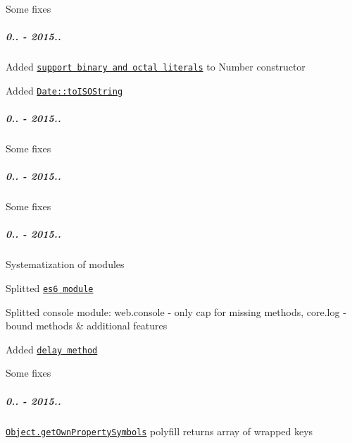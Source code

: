 \begin{DoxyItemize}
\item Some fixes
\end{DoxyItemize}

\subparagraph*{0.. -\/ 2015..}


\begin{DoxyItemize}
\item Added \href{https://github.com/zloirock/core-js/#ecmascript-6-number}{\tt support binary and octal literals} to {\ttfamily Number} constructor
\item Added \href{https://github.com/zloirock/core-js/#ecmascript-5}{\tt {\ttfamily Date\+::to\+I\+S\+O\+String}}
\end{DoxyItemize}

\subparagraph*{0.. -\/ 2015..}


\begin{DoxyItemize}
\item Some fixes
\end{DoxyItemize}

\subparagraph*{0.. -\/ 2015..}


\begin{DoxyItemize}
\item Some fixes
\end{DoxyItemize}

\subparagraph*{0.. -\/ 2015..}


\begin{DoxyItemize}
\item Systematization of modules
\item Splitted \href{https://github.com/zloirock/core-js/#ecmascript-6}{\tt {\ttfamily es6} module}
\item Splitted {\ttfamily console} module\+: {\ttfamily web.\+console} -\/ only cap for missing methods, {\ttfamily core.\+log} -\/ bound methods \& additional features
\item Added \href{https://github.com/zloirock/core-js/#delay}{\tt {\ttfamily delay} method}
\item Some fixes
\end{DoxyItemize}

\subparagraph*{0.. -\/ 2015..}


\begin{DoxyItemize}
\item \href{https://github.com/zloirock/core-js/#ecmascript-6-symbol}{\tt {\ttfamily Object.\+get\+Own\+Property\+Symbols}} polyfill returns array of wrapped keys
\end{DoxyItemize}


